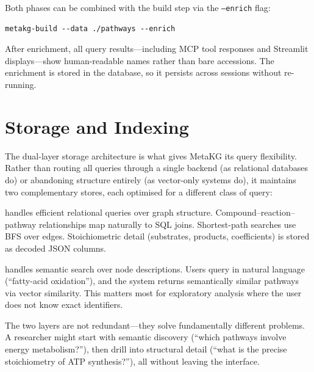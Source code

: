 \documentclass[10pt]{article}
\begin{document}
Both phases can be combined with the build step via the \texttt{--enrich}
flag:

\begin{lstlisting}[style=bash]
metakg-build --data ./pathways --enrich
\end{lstlisting}

After enrichment, all query results---including MCP tool responses and
Streamlit displays---show human-readable names rather than bare accessions.
The enrichment is stored in the database, so it persists across sessions
without re-running.

\section{Storage and Indexing}
\label{sec:storage}

The dual-layer storage architecture is what gives MetaKG its query
flexibility. Rather than routing all queries through a single backend (as
relational databases do) or abandoning structure entirely (as vector-only
systems do), it maintains two complementary stores, each optimised for a
different class of query:

\begin{description}[leftmargin=*,itemsep=3pt]
\item[SQLite] handles efficient relational queries over graph structure.
  Compound--reaction--pathway relationships map naturally to SQL joins.
  Shortest-path searches use BFS over edges. Stoichiometric detail
  (substrates, products, coefficients) is stored as decoded JSON columns.

\item[LanceDB + embeddings] handles semantic search over node descriptions.
  Users query in natural language (``fatty-acid oxidation''), and the system
  returns semantically similar pathways via vector similarity. This matters
  most for exploratory analysis where the user does not know exact identifiers.
\end{description}

The two layers are not redundant---they solve fundamentally different
problems. A researcher might start with semantic discovery (``which pathways
involve energy metabolism?''), then drill into structural detail (``what is the
precise stoichiometry of ATP synthesis?''), all without leaving the interface.
\end{document}
